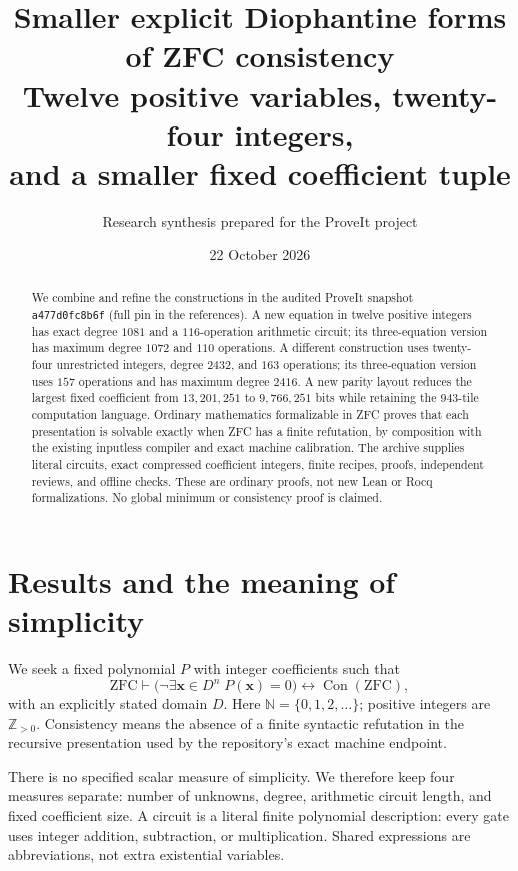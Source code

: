 \documentclass[11pt]{article}
\title{\textbf{Smaller explicit Diophantine forms\\of ZFC consistency}\\[5pt]
\large Twelve positive variables, twenty-four integers,\\and a smaller fixed coefficient tuple}
\author{Research synthesis prepared for the ProveIt project}
\date{22 October 2026}
\theoremstyle{remark}\newtheorem{remark}[theorem]{Remark}
\newcommand{\Z}{\mathbb Z}
\newcommand{\N}{\mathbb N}
\newcommand{\Con}{\operatorname{Con}}
\begin{document}
\maketitle
\begin{abstract}
We combine and refine the constructions in the audited ProveIt snapshot
\texttt{a477d0fc8b6f} (full pin in the references).
A new equation in twelve positive integers has exact degree \(1081\)
and a \(116\)-operation arithmetic circuit; its three-equation version
has maximum degree \(1072\) and \(110\) operations.
A different construction uses twenty-four unrestricted integers,
degree \(2432\), and \(163\) operations; its three-equation version
uses \(157\) operations and has maximum degree \(2416\).
A new parity layout reduces the largest fixed coefficient from
\(13{,}201{,}251\) to \(9{,}766{,}251\) bits while retaining the
943-tile computation language.
Ordinary mathematics formalizable in ZFC proves that each presentation
is solvable exactly when ZFC has a finite refutation, by composition
with the existing inputless compiler and exact machine calibration.
The archive supplies literal circuits, exact compressed coefficient
integers, finite recipes, proofs, independent reviews, and offline checks.
These are ordinary proofs, not new Lean or Rocq formalizations.
No global minimum or consistency proof is claimed.
\end{abstract}
\clearpage
\tableofcontents
\clearpage

\section{Results and the meaning of simplicity}

We seek a fixed polynomial \(P\) with integer coefficients such that
\[
\mathrm{ZFC}\vdash
\bigl(\neg\exists\mathbf x\in D^n\;P(\mathbf x)=0\bigr)
\longleftrightarrow\Con(\mathrm{ZFC}),
\tag{1.1}
\]
with an explicitly stated domain \(D\).
Here \(\N=\{0,1,2,\ldots\}\); positive integers are \(\Z_{>0}\).
Consistency means the absence of a finite syntactic refutation in the
recursive presentation used by the repository's exact machine endpoint.

There is no specified scalar measure of simplicity. We therefore keep
four measures separate: number of unknowns, degree, arithmetic circuit
length, and fixed coefficient size. A circuit is a literal finite
polynomial description: every gate uses integer addition, subtraction,
or multiplication. Shared expressions are abbreviations, not extra
existential variables.
\end{document}
